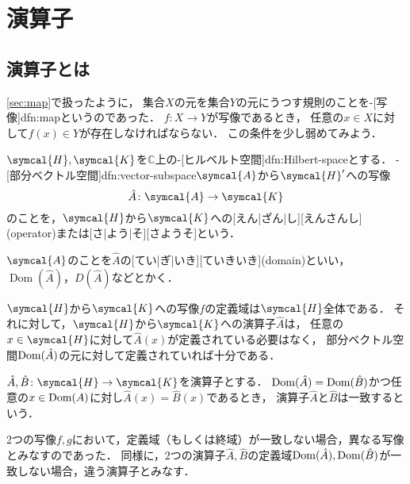 \documentclass[../sotsu.tex]{subfiles}
\begin{document}
\section{演算子}
\label{sec:operator}

\subsection{演算子とは}
\label{sec:operator-intro}

\cref{sec:map}で扱ったように，
集合$X$の元を集合$Y$の元にうつす規則のことを-[写像]{dfn:map}というのであった．
$f \colon X \to Y$が写像であるとき，
任意の$x \in X$に対して$f(x) \in Y$が存在しなければならない．
この条件を少し弱めてみよう．

\begin{definition}[演算子]
    $\symcal{H}, \symcal{K}$を$ℂ$上の-[ヒルベルト空間]{dfn:Hilbert-space}とする．
    -[部分ベクトル空間]{dfn:vector-subspace}$\symcal{A}$から$\symcal{H}'$への写像
    \begin{equation*}
        \hat{A} \colon \symcal{A} \to \symcal{K}
    \end{equation*}
    のことを，$\symcal{H}$から$\symcal{K}$への[えん|ざん|し][えんさんし](operator)または[さ|よう|そ][さようそ]という．
\end{definition}

\begin{definition}[演算子の定義域]
    $\symcal{A}$のことを$\hat{A}$の[てい|ぎ|いき][ていきいき](domain)といい，$\operatorname{Dom}(\hat{A})$，$D(\hat{A})$などとかく．
\end{definition}

$\symcal{H}$から$\symcal{K}$への写像$f$の定義域は$\symcal{H}$全体である．
それに対して，$\symcal{H}$から$\symcal{K}$への演算子$\hat{A}$は，
任意の$x \in \symcal{H}$に対して$\hat{A}(x)$が定義されている必要はなく，
部分ベクトル空間$\operatorname{Dom}(\hat{A})$の元に対して定義されていれば十分である．


\begin{definition}[演算子の一致]
    $\hat{A}, \hat{B} \colon \symcal{H} \to \symcal{K}$を演算子とする．
    $\operatorname{Dom}(\hat{A}) = \operatorname{Dom}(\hat{B})$かつ任意の$x \in \operatorname{Dom}(A)$に対し$\hat{A}(x) = \hat{B}(x)$であるとき，
    演算子$\hat{A}$と$\hat{B}$は一致するという．
\end{definition}

2つの写像$f, g$において，定義域（もしくは終域）が一致しない場合，異なる写像とみなすのであった．
同様に，2つの演算子$\hat{A}, \hat{B}$の定義域$\operatorname{Dom}(\hat{A}), \operatorname{Dom}(\hat{B})$が一致しない場合，違う演算子とみなす．
\end{document}
